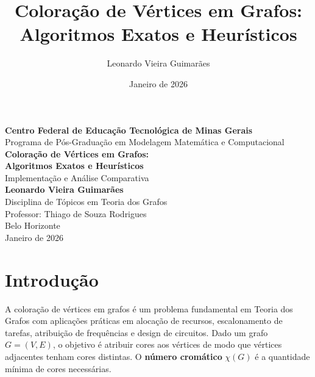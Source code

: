 \documentclass[12pt]{article}
\title{Coloração de Vértices em Grafos: Algoritmos Exatos e Heurísticos}
\author{Leonardo Vieira Guimarães}
\date{Janeiro de 2026}
\begin{document}
\onehalfspacing

\begin{titlepage}
    \centering
    \vspace*{1.5cm}
    
    {\Large \textbf{Centro Federal de Educação Tecnológica de Minas Gerais}}\\[0.5cm]
    
    {\large Programa de Pós-Graduação em Modelagem Matemática e Computacional}\\[3.5cm]
    
    
    {\LARGE \textbf{Coloração de Vértices em Grafos:}}\\[0.5cm]
    {\LARGE \textbf{Algoritmos Exatos e Heurísticos}}\\[0.8cm]
    {\large Implementação e Análise Comparativa}\\[3cm]
    
    {\large \textbf{Leonardo Vieira Guimarães}}\\[0.5cm]
    
    {\normalsize Disciplina de Tópicos em Teoria dos Grafos}\\[0.3cm]
    {\normalsize Professor: Thiago de Souza Rodrigues}\\[4cm]
    
    {\large Belo Horizonte}\\[0.3cm]
    {\large Janeiro de 2026}
    
\end{titlepage}

\newpage
\tableofcontents
\newpage

\section{Introdução}

A coloração de vértices em grafos é um problema fundamental em Teoria dos Grafos com aplicações práticas em alocação de recursos, escalonamento de tarefas, atribuição de frequências e design de circuitos. Dado um grafo $G = (V, E)$, o objetivo é atribuir cores aos vértices de modo que vértices adjacentes tenham cores distintas. O \textbf{número cromático} $\chi(G)$ é a quantidade mínima de cores necessárias.
\end{document}
